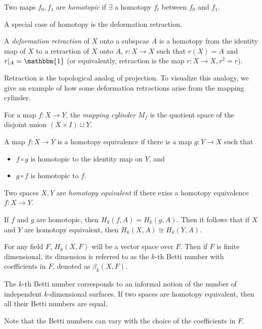 \documentclass[11pt,reqno,oneside,a4paper]{article}
\begin{document}
\begin{defn}
	Two maps $f_0, f_1$ are \textit{homotopic} if $\exists$ a homotopy $f_t$ between $f_0$ and $f_1$.  
\end{defn}

A special case of homotopy is the deformation retraction. 

\begin{defn}
	A \textit{deformation retraction} of $X$ onto a subspcae $A$ is a homotopy from the identity map of $X$ to a retraction of $X$ onto $A$, $r: X\to X$ such that $r(X) = A$ and $r|_A = \mathbbm{1}$ (or equivalently, retraction is the map $r: X\to X, r^2 =r$). 
\end{defn}

Retraction is the topological analog of projection. To visualize this analogy, we give an example of how some deformation retractions arise from the mapping cylinder.

\begin{defn}
	For a map $f: X\to Y$, the \textit{mapping cylinder} $M_f$ is the quotient space of the disjoint union $(X \times I) \sqcup Y$.
\end{defn}

\begin{defn}
A map $f:X \to Y$ is a homotopy equivalence if there is a map $g: Y \to X$ such that 
\begin{itemize}
	\item $f\circ g$ is homotopic to the identity map on $Y$, and
	\item $g\circ f$ is homotopic to $f$.
\end{itemize}

Two spaces $X,Y$ are\textit{ homotopy equivalent} if there exiss a homotopy equivalence $f: X \to Y. $
\end{defn}

\begin{defn}
	If $f$ and $g$ are homotopic, then $H_k(f,A) = H_k(g,A).$ Then it follows that if $X$ and $Y$ are homotopy equivalent, then $H_k(X,A) \cong H_k(Y,A) $.
\end{defn}

\begin{defn}
	For any field $F$, $H_k(X,F)$ will be a vector space over $F$. Then if $F$ is finite dimensional, its dimension is referred to as the $k$-th Betti number with coefficients in $F$, denoted as $\beta_{k}(X,F).$
	
	The $k$-th Betti number corresponds to an informal notion of the number of independent $k$-dimensional surfaces. If two spaces are homotopy equivalent, then all their Betti numbers are equal. 
	
	Note that the Betti numbers can vary with the choice of the coefficients in $F$. 
\end{defn}
\end{document}
